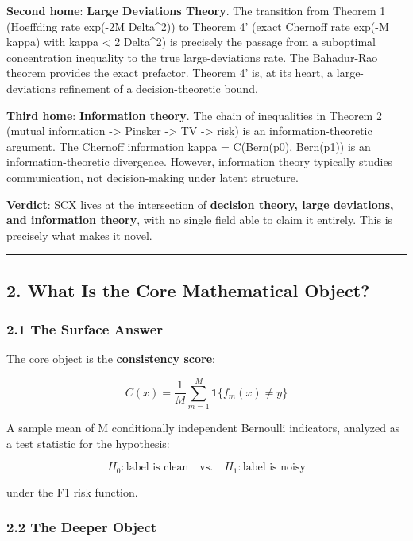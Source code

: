 \documentclass[
  12pt,
]{ctexart}
\begin{document}
\textbf{Second home}: \textbf{Large Deviations Theory}. The transition
from Theorem 1 (Hoeffding rate exp(-2M Delta\^{}2)) to Theorem 4' (exact
Chernoff rate exp(-M kappa) with kappa \textless{} 2 Delta\^{}2) is
precisely the passage from a suboptimal concentration inequality to the
true large-deviations rate. The Bahadur-Rao theorem provides the exact
prefactor. Theorem 4' is, at its heart, a large-deviations refinement of
a decision-theoretic bound.

\textbf{Third home}: \textbf{Information theory}. The chain of
inequalities in Theorem 2 (mutual information -\textgreater{} Pinsker
-\textgreater{} TV -\textgreater{} risk) is an information-theoretic
argument. The Chernoff information kappa = C(Bern(p0), Bern(p1)) is an
information-theoretic divergence. However, information theory typically
studies communication, not decision-making under latent structure.

\textbf{Verdict}: SCX lives at the intersection of \textbf{decision
theory, large deviations, and information theory}, with no single field
able to claim it entirely. This is precisely what makes it novel.

\begin{center}\rule{0.5\linewidth}{0.5pt}\end{center}

\subsection{2. What Is the Core Mathematical
Object?}\label{what-is-the-core-mathematical-object}

\subsubsection{2.1 The Surface Answer}\label{the-surface-answer-1}

The core object is the \textbf{consistency score}:

\[C(x) = \frac{1}{M}\sum_{m=1}^M \mathbf{1}\{f_m(x) \neq y\}\]

A sample mean of M conditionally independent Bernoulli indicators,
analyzed as a test statistic for the hypothesis:

\[H_0: \text{label is clean} \quad\text{vs.}\quad H_1: \text{label is noisy}\]

under the F1 risk function.

\subsubsection{2.2 The Deeper Object}\label{the-deeper-object}
\end{document}
